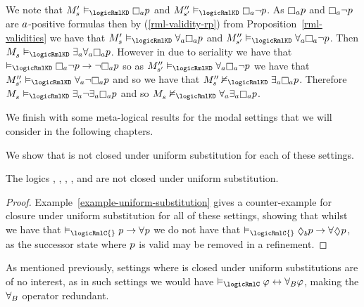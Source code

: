 \begin{example}
We note that $\kPModelP{\kStateS} \entails_\logicRmlKD\necessaryA \atomP$ and $\kPModelPP{\kStateSP} \entails_\logicRmlKD\necessaryA \lnot \atomP$.
As $\necessaryA \atomP$ and $\necessaryA \lnot \atomP$ are $a$-positive formulas then by (\ref{rml-validity-rp}) from Proposition~\ref{rml-validities} we have that $\kPModelP{\kStateS} \entails_\logicRmlKD\allrefsA \necessaryA \atomP$ and $\kPModelPP{\kStateSP} \entails_\logicRmlKD\allrefsA \necessaryA \lnot \atomP$.
Then $\kPModel{\kStateS} \entails_\logicRmlKD\somerefsA \allrefsA \necessaryA \atomP$.
However in \classKD{} due to seriality we have that $\entails_\logicRmlKD\necessaryA \lnot \atomP \implies \lnot \necessaryA \atomP$ so as $\kPModelPP{\kStateSP} \entails_\logicRmlKD\allrefsA \necessaryA \lnot \atomP$ we have that $\kPModelPP{\kStateSP} \entails_\logicRmlKD\allrefsA \lnot \necessaryA \atomP$ and so we have that $\kPModelPP{\kStateS} \nentails_\logicRmlKD\somerefsA \necessaryA \atomP$.
Therefore $\kPModel{\kStateS} \entails_\logicRmlKD\somerefsA \lnot \somerefsA \necessaryA \atomP$ and so $\kPModel{\kStateS} \nentails_\logicRmlKD\allrefsA \somerefsA \necessaryA \atomP$.
\end{example}

We finish with some meta-logical results for the modal settings that we will consider in the following chapters.

We show that \logicRml{} is not closed under uniform substitution for each of these settings.

\begin{proposition}
The logics \logicRmlK{}, \logicRmlKF{}, \logicRmlKFF{}, \logicRmlKD{}, and \logicRmlS{} are not closed under uniform substitution.
\end{proposition}

\begin{proof}
Example~\ref{example-uniform-substitution} gives a counter-example for closure under uniform substitution for all of these settings, showing that whilst we have that $\entails_\logicRmlC{} \atomP \implies \allrefs \atomP$ we do not have that $\entails_\logicRmlC{} \possibleB \atomP \implies \allrefs \possible \atomP$, as the successor state where $p$ is valid may be removed in a refinement.
\end{proof}

As mentioned previously, settings where \logicRml{} is closed under uniform substitutions are of no interest, as in such settings we would have $\entails_\logicRmlC \phi \iff \allrefsBs \phi$, making the ${\forall_{B}}$ operator redundant.

